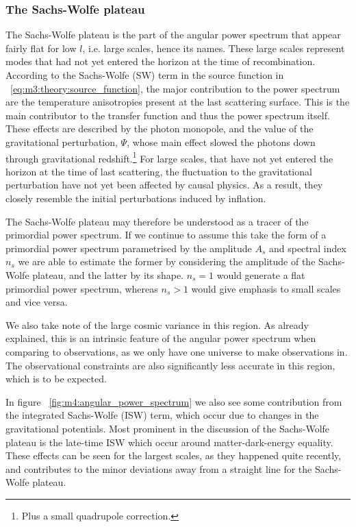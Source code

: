     \subsubsection{The Sachs-Wolfe plateau}
        The Sachs-Wolfe plateau is the part of the angular power spectrum that appear fairly flat for low $l$, i.e. large scales, hence its names. These large scales represent modes that had not yet entered the horizon at the time of recombination. According to the Sachs-Wolfe (SW) term in the source function in ~\cref{eq:m3:theory:source_function}, the major contribution to the power spectrum are the temperature anisotropies present at the last scattering surface. This is the main contributor to the transfer function and thus the power spectrum itself. These effects are described by the photon monopole, and the value of the gravitational perturbation, $\Psi$, whose main effect slowed the photons down through gravitational redshift.\footnote{Plus a small quadrupole correction.} For large scales, that have not yet entered the horizon at the time of last scattering, the fluctuation to the gravitational perturbation have not yet been affected by causal physics. As a result, they closely resemble the initial perturbations induced by inflation. 

        The Sachs-Wolfe plateau may therefore be understood as a tracer of the primordial power spectrum. If we continue to assume this take the form of a primordial power spectrum parametrised by the amplitude $A_s$ and spectral index $n_s$ we are able to estimate the former by considering the amplitude of the Sachs-Wolfe plateau, and the latter by its shape. $n_s=1$ would generate a flat primordial power spectrum, whereas $n_s>1$ would give emphasis to small scales and vice versa. 

        We also take note of the large cosmic variance in this region. As already explained, this is an intrinsic feature of the angular power spectrum when comparing to observations, as we only have one universe to make observations in. The observational constraints are also significantly less accurate in this region, which is to be expected. 
        
        In figure ~\cref{fig:m4:angular_power_spectrum} we also see some contribution from the integrated Sachs-Wolfe (ISW) term, which occur due to changes in the gravitational potentials. Most prominent in the discussion of the Sachs-Wolfe plateau is the late-time ISW which occur around matter-dark-energy equality. These effects can be seen for the largest scales, as they happened quite recently, and contributes to the minor deviations away from a straight line for the Sachs-Wolfe plateau.
        
